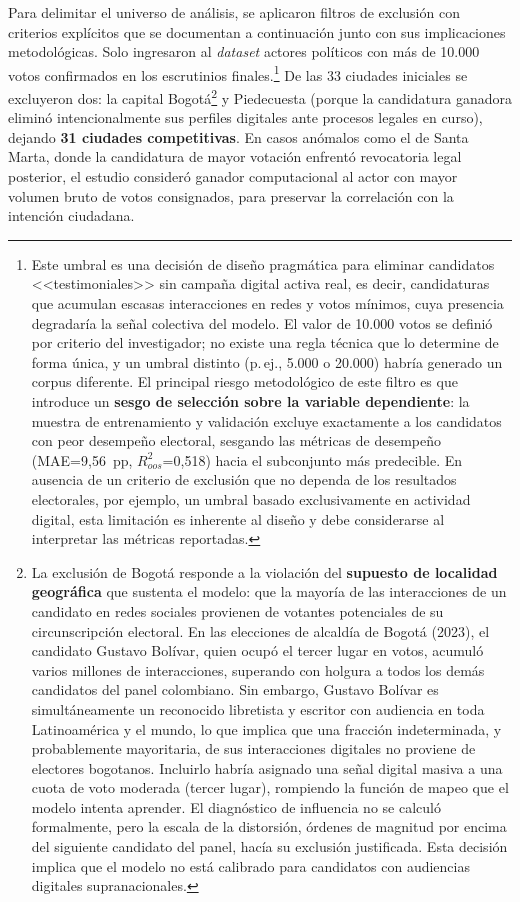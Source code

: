 Para delimitar el universo de análisis, se aplicaron filtros de exclusión con criterios explícitos que se documentan a continuación junto con sus implicaciones metodológicas. Solo ingresaron al \textit{dataset} actores políticos con más de 10.000 votos confirmados en los escrutinios finales.\footnote{Este umbral es una decisión de diseño pragmática para eliminar candidatos <<testimoniales>> sin campaña digital activa real, es decir, candidaturas que acumulan escasas interacciones en redes y votos mínimos, cuya presencia degradaría la señal colectiva del modelo. El valor de 10.000 votos se definió por criterio del investigador; no existe una regla técnica que lo determine de forma única, y un umbral distinto (p.\,ej., 5.000 o 20.000) habría generado un corpus diferente. El principal riesgo metodológico de este filtro es que introduce un \textbf{sesgo de selección sobre la variable dependiente}: la muestra de entrenamiento y validación excluye exactamente a los candidatos con peor desempeño electoral, sesgando las métricas de desempeño (MAE=9{,}56~pp, $R^2_{oos}$=0{,}518) hacia el subconjunto más predecible. En ausencia de un criterio de exclusión que no dependa de los resultados electorales, por ejemplo, un umbral basado exclusivamente en actividad digital, esta limitación es inherente al diseño y debe considerarse al interpretar las métricas reportadas.} De las 33 ciudades iniciales se excluyeron dos: la capital Bogotá\footnote{La exclusión de Bogotá responde a la violación del \textbf{supuesto de localidad geográfica} que sustenta el modelo: que la mayoría de las interacciones de un candidato en redes sociales provienen de votantes potenciales de su circunscripción electoral. En las elecciones de alcaldía de Bogotá (2023), el candidato Gustavo Bolívar, quien ocupó el tercer lugar en votos, acumuló varios millones de interacciones, superando con holgura a todos los demás candidatos del panel colombiano. Sin embargo, Gustavo Bolívar es simultáneamente un reconocido libretista y escritor con audiencia en toda Latinoamérica y el mundo, lo que implica que una fracción indeterminada, y probablemente mayoritaria, de sus interacciones digitales no proviene de electores bogotanos. Incluirlo habría asignado una señal digital masiva a una cuota de voto moderada (tercer lugar), rompiendo la función de mapeo que el modelo intenta aprender. El diagnóstico de influencia no se calculó formalmente, pero la escala de la distorsión, órdenes de magnitud por encima del siguiente candidato del panel, hacía su exclusión justificada. Esta decisión implica que el modelo no está calibrado para candidatos con audiencias digitales supranacionales.} y Piedecuesta (porque la candidatura ganadora eliminó intencionalmente sus perfiles digitales ante procesos legales en curso), dejando \textbf{31 ciudades competitivas}. En casos anómalos como el de Santa Marta, donde la candidatura de mayor votación enfrentó revocatoria legal posterior, el estudio consideró ganador computacional al actor con mayor volumen bruto de votos consignados, para preservar la correlación con la intención ciudadana.

